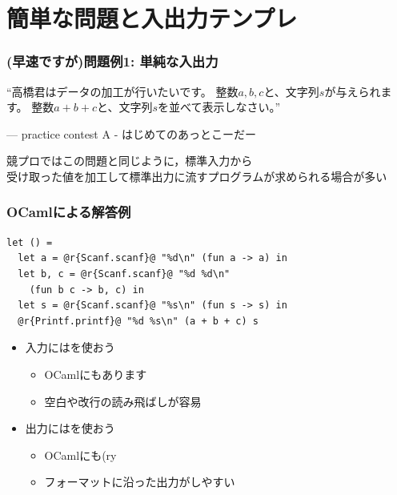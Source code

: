 \documentclass[dvipdfmx,cjk,xcolor=dvipsnames,envcountsect,notheorems,12pt]{beamer}
\theoremstyle{definition}
\begin{document}
\section{簡単な問題と入出力テンプレ}

\begin{frame}
	\frametitle{(早速ですが)問題例1: 単純な入出力}
	\begin{block}{}
		{\Large ``高橋君はデータの加工が行いたいです。
		整数$a,b,c$と、文字列$s$が与えられます。
		整数$a+b+c$と、文字列$s$を並べて表示しなさい。''}
		\begin{flushright}
			--- practice contest A - はじめてのあっとこーだー
		\end{flushright}
	\end{block}
	\vfill
	{\large 競プロではこの問題と同じように，標準入力から\\受け取った値を加工して標準出力に流すプログラムが求められる場合が多い}
\end{frame}

\begin{frame}[fragile]
	\frametitle{OCamlによる解答例}
	\begin{lstlisting}
let () =
  let a = @r{Scanf.scanf}@ "%d\n" (fun a -> a) in
  let b, c = @r{Scanf.scanf}@ "%d %d\n"
    (fun b c -> b, c) in
  let s = @r{Scanf.scanf}@ "%s\n" (fun s -> s) in
  @r{Printf.printf}@ "%d %s\n" (a + b + c) s
\end{lstlisting}
	\begin{itemize}
		\item 入力にはを使おう
			\begin{itemize}
				\item OCamlにもあります
				\item 空白や改行の読み飛ばしが容易
			\end{itemize}
		\item 出力にはを使おう
			\begin{itemize}
				\item OCamlにも(ry
				\item フォーマットに沿った出力がしやすい
			\end{itemize}
	\end{itemize}
\end{frame}
\end{document}
